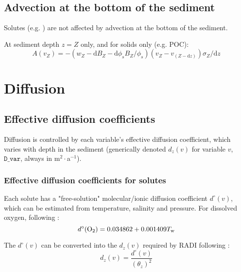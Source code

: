 \documentclass[a4paper]{article}
\newcommand{\D}[1]{\mathrm{d}#1}
\newcommand{\code}[1]{\texttt{#1}}
\begin{document}
\subsection{Advection at the bottom of the sediment}\label{sx:adv_bot}

Solutes (e.g. ) are not affected by advection at the bottom of the sediment.

At sediment depth $z = Z$ only, and for solids only (e.g. POC):
\begin{equation}
A(v_Z) = -(w_Z - \D{B_Z} - \D{\phi_s} B_Z / \phi_s) (v_Z - v_{(Z-\D{z})}) \sigma_Z / \D{z}
\end{equation}


\section{Diffusion}\label{sx:diffusion}

\subsection{Effective diffusion coefficients}

Diffusion is controlled by each variable's effective diffusion coefficient, which varies with depth in the sediment (generically denoted $d_z(v)$ for variable $v$, $\code{D\_var}$, always in m$^2\cdot$a$^{-1}$).

\subsubsection{Effective diffusion coefficients for solutes}

Each solute has a "free-solution" molecular/ionic diffusion coefficient $d^\circ(v)$, which can be estimated from temperature, salinity and pressure. For dissolved oxygen, following \citet{li_diffusion_1974}:
\begin{equation}
d^\circ(\ce{O2}) = 0.034862 + 0.001409 T_\mathrm{w}
\end{equation}

The $d^\circ(v)$ can be converted into the $d_z(v)$ required by RADI following \citet{boudreau_method--lines_1996}:
\begin{equation}
d_z(v) = \frac{d^\circ(v)}{(\theta_z)^2}
\end{equation}
\end{document}
